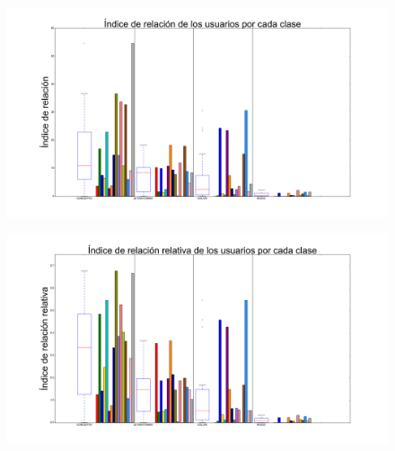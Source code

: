 \documentclass{beamer}
\begin{document}
\begin{frame}

\begin{figure}[h]
 \centering
  \begin{minipage}[c]{1\textwidth}
	\centering	
	\includegraphics[scale=0.23]{ir_uxc.png}
  \end{minipage}
\end{figure}

\end{frame}
\begin{frame}

\begin{figure}[h]
 \centering
  \begin{minipage}[c]{1\textwidth}
	\centering	
	\includegraphics[scale=0.23]{irr_uxc.png}
  \end{minipage}
\end{figure}

\end{frame}
\end{document}
